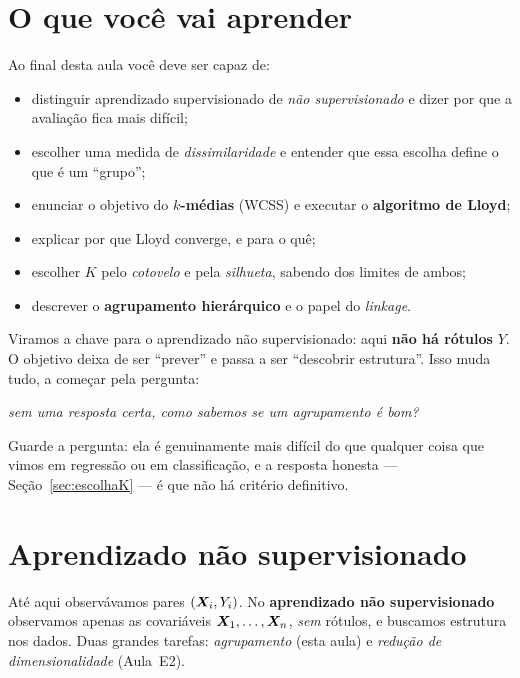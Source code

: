 \documentclass[11pt,a4paper]{article}
\title{}
\date{}
\begin{document}

\section*{O que você vai aprender}
Ao final desta aula você deve ser capaz de:
\begin{itemize}[leftmargin=1.4cm]
  \item distinguir aprendizado supervisionado de \emph{não supervisionado} e dizer
        por que a avaliação fica mais difícil;
  \item escolher uma medida de \emph{dissimilaridade} e entender que essa escolha
        define o que é um ``grupo'';
  \item enunciar o objetivo do \textbf{$k$-médias} (WCSS) e executar o
        \textbf{algoritmo de Lloyd};
  \item explicar por que Lloyd converge, e para o quê;
  \item escolher $K$ pelo \emph{cotovelo} e pela \emph{silhueta}, sabendo dos
        limites de ambos;
  \item descrever o \textbf{agrupamento hierárquico} e o papel do \emph{linkage}.
\end{itemize}

\noindent
Viramos a chave para o aprendizado não supervisionado: aqui \textbf{não há rótulos}
$Y$. O objetivo deixa de ser ``prever'' e passa a ser ``descobrir estrutura''. Isso
muda tudo, a começar pela pergunta:

\begin{center}\itshape
  sem uma resposta certa, como sabemos se um agrupamento é bom?
\end{center}

\noindent
Guarde a pergunta: ela é genuinamente mais difícil do que qualquer coisa que vimos em
regressão ou em classificação, e a resposta honesta --- Seção~\ref{sec:escolhaK} ---
é que não há critério definitivo.

\section{Aprendizado não supervisionado}
Até aqui observávamos pares $(\bm{X}_i,Y_i)$. No \textbf{aprendizado não
supervisionado} observamos apenas as covariáveis $\bm{X}_1,\dots,\bm{X}_n$, \emph{sem}
rótulos, e buscamos estrutura nos dados. Duas grandes tarefas:
\emph{agrupamento} (esta aula) e \emph{redução de dimensionalidade} (Aula~E2).
\end{document}
